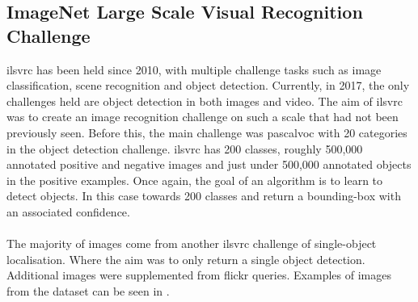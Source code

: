 \subsection{ImageNet Large Scale Visual Recognition Challenge}
\gls{ilsvrc} has been held since 2010, with multiple challenge tasks such as image classification, scene recognition and object detection. Currently, in 2017, the only challenges held are object detection in both images and video. The aim of \gls{ilsvrc} was to create an image recognition challenge on such a scale that had not been previously seen. Before this, the main challenge was \gls{pascalvoc} with 20 categories in the object detection challenge. \gls{ilsvrc} has 200 classes, roughly 500,000 annotated positive and negative images and just under 500,000 annotated objects in the positive examples. Once again, the goal of an algorithm is to learn to detect objects. In this case towards 200 classes and return a bounding-box with an associated confidence.
\\\\
The majority of images come from another \gls{ilsvrc} challenge of single-object localisation. Where the aim was to only return a single object detection. Additional images were supplemented from flickr queries. Examples of images from the dataset can be seen in .


